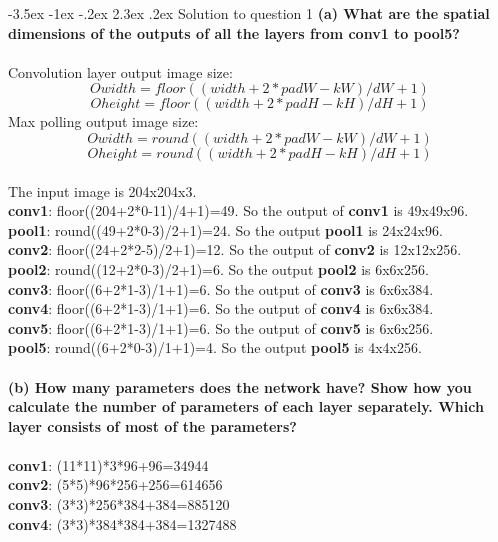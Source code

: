 \documentclass[12pt]{article}
\makeatletter
\renewcommand\section{\@startsection {section}{1}{\z@}%
	{-3.5ex \@plus -1ex \@minus -.2ex}%
	{2.3ex \@plus.2ex}%
	{\normalfont\large\bfseries}}%
\makeatother
\begin{document}
	\section{Solution to question 1}
	\textbf{(a) What are the spatial dimensions of the outputs of all the layers from conv1 to pool5?}\\
	\\
	\noindent
	Convolution layer output image size:\\
	$$Owidth = floor((width + 2*padW - kW) / dW + 1)$$
	$$Oheight = floor((width + 2*padH - kH) / dH+ 1)$$
	Max polling output image size:\\
	$$Owidth = round((width + 2*padW - kW) / dW + 1)$$
	$$Oheight = round((width + 2*padH - kH) / dH+ 1)$$
	\\
	\noindent
	The input image is 204x204x3.\\
	\textbf{conv1}: floor((204+2*0-11)/4+1)=49. So the output of \textbf{conv1} is 49x49x96.\\
	\textbf{pool1}: round((49+2*0-3)/2+1)=24. So the output \textbf{pool1} is 24x24x96.\\
	\textbf{conv2}: floor((24+2*2-5)/2+1)=12. So the output of \textbf{conv2} is 12x12x256.\\
	\textbf{pool2}: round((12+2*0-3)/2+1)=6. So the output \textbf{pool2} is 6x6x256.\\
	\textbf{conv3}: floor((6+2*1-3)/1+1)=6. So the output of \textbf{conv3} is 6x6x384.\\
	\textbf{conv4}: floor((6+2*1-3)/1+1)=6. So the output of \textbf{conv4} is 6x6x384.\\
	\textbf{conv5}: floor((6+2*1-3)/1+1)=6. So the output of \textbf{conv5} is 6x6x256.\\
	\textbf{pool5}: round((6+2*0-3)/1+1)=4. So the output \textbf{pool5} is 4x4x256.\\
	\\
	\noindent
	\textbf{(b) How many parameters does the network have? Show how you calculate the number of parameters of each layer separately. Which layer consists of most of the parameters?}\\
	\\
	\noindent
	\textbf{conv1}: (11*11)*3*96+96=34944\\
	\textbf{conv2}: (5*5)*96*256+256=614656\\
	\textbf{conv3}: (3*3)*256*384+384=885120\\
	\textbf{conv4}: (3*3)*384*384+384=1327488\\
\end{document}
